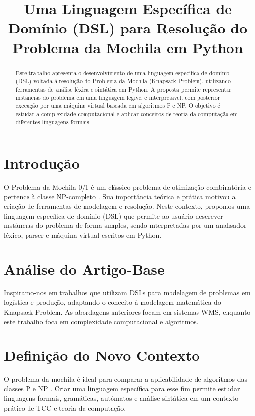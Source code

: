 \documentclass[conference]{IEEEtran}
\title{Uma Linguagem Específica de Domínio (DSL) para Resolução do Problema da Mochila em Python}
\author{
    \IEEEauthorblockN{Guilherme Cavenaghi - 109317,
    Rafael Godoy - 110453,
    Rafael Pereira de Souza - 109680}
    \IEEEauthorblockA{Centro Universitário FHO\\
    \{guilherme.cavenaghi, Rafagodoy330, r.souza\}@alunos.fho.edu.br}
}
\begin{document}
\maketitle

\begin{abstract}
Este trabalho apresenta o desenvolvimento de uma linguagem específica de domínio (DSL) voltada à resolução do Problema da Mochila (Knapsack Problem), utilizando ferramentas de análise léxica e sintática em Python. A proposta permite representar instâncias do problema em uma linguagem legível e interpretável, com posterior execução por uma máquina virtual baseada em algoritmos P e NP. O objetivo é estudar a complexidade computacional e aplicar conceitos de teoria da computação em diferentes linguagens formais.
\end{abstract}

\section{Introdução}
O Problema da Mochila 0/1 é um clássico problema de otimização combinatória e pertence à classe NP-completo \cite{martello1990knapsack}. Sua importância teórica e prática motivou a criação de ferramentas de modelagem e resolução. Neste contexto, propomos uma linguagem específica de domínio (DSL) que permite ao usuário descrever instâncias do problema de forma simples, sendo interpretadas por um analisador léxico, parser e máquina virtual escritos em Python.

\section{Análise do Artigo-Base}
Inspiramo-nos em trabalhos que utilizam DSLs para modelagem de problemas em logística e produção, adaptando o conceito à modelagem matemática do Knapsack Problem. As abordagens anteriores focam em sistemas WMS, enquanto este trabalho foca em complexidade computacional e algoritmos.

\section{Definição do Novo Contexto}
O problema da mochila é ideal para comparar a aplicabilidade de algoritmos das classes P e NP \cite{cormen2022algorithms}. Criar uma linguagem específica para esse fim permite estudar linguagens formais, gramáticas, autômatos e análise sintática em um contexto prático de TCC e teoria da computação.
\end{document}
